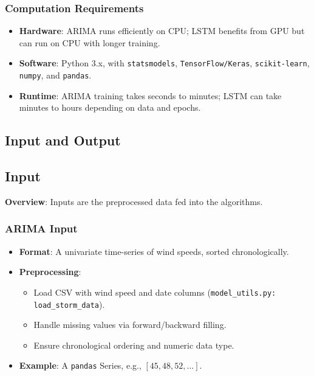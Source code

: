 \begin{center}
{
	}
\end{center}






\subsubsection{Computation Requirements}

\begin{itemize}
	\item \textbf{Hardware}: ARIMA runs efficiently on CPU; LSTM benefits from GPU but can run on CPU with longer training.
	\item \textbf{Software}: Python 3.x, with \texttt{statsmodels}, \texttt{TensorFlow/Keras}, \texttt{scikit-learn}, \texttt{numpy}, and \texttt{pandas}.
	\item \textbf{Runtime}: ARIMA training takes seconds to minutes; LSTM can take minutes to hours depending on data and epochs.
\end{itemize}

\subsection{Input and Output}
\subsection{Input}
\textbf{Overview}: Inputs are the preprocessed data fed into the algorithms.

\subsubsection{ARIMA Input}
\begin{itemize}
	\item \textbf{Format}: A univariate time-series of wind speeds, sorted chronologically.
	\item \textbf{Preprocessing}:
	\begin{itemize}
		\item Load CSV with wind speed and date columns (\texttt{model\_utils.py: load\_storm\_data}).
		\item Handle missing values via forward/backward filling.
		\item Ensure chronological ordering and numeric data type.
	\end{itemize}
	\item \textbf{Example}: A \texttt{pandas} Series, e.g., \([45, 48, 52, \ldots]\).
\end{itemize}

